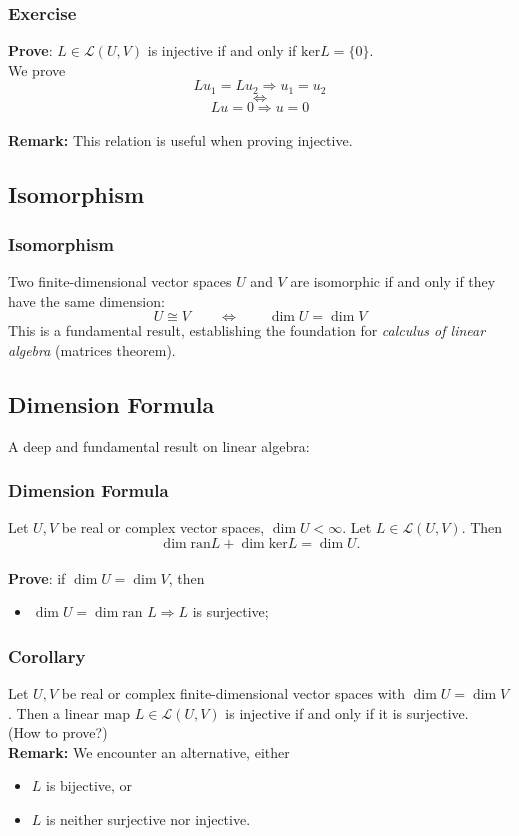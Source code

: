 \documentclass[12pt, t]{beamer}
\renewcommand{\emph}[1]{{\color{Turquoise3}\textsl{#1}}}
\newcommand{\nullspace}{~\\[15pt]}
\newcommand{\remark}{\textbf{Remark: }}
\begin{document}
\begin{frame}
    \frametitle{Exercise}
    \textbf{Prove}:
    $L\in\mathcal{L}(U,V)$ is injective if and only if $\text{ker}L=\{0\}$.
    \nullspace
    \pause
    We prove
    $$
        Lu_1=Lu_2\Rightarrow u_1=u_2
    $$
    $$
        \Leftrightarrow
    $$
    $$
        Lu=0\Rightarrow u=0
    $$
    \nullspace
    \remark This relation is useful when proving injective.
\end{frame}

\subsection{Isomorphism}
\begin{frame}
    \frametitle{Isomorphism}
    Two finite-dimensional vector spaces $U$ and $V$ are isomorphic if and only if they have the same dimension:
    \[U\cong V\qquad\Leftrightarrow\qquad\dim U=\dim V\]
    This is a fundamental result, establishing the foundation for \emph{calculus of linear algebra} (matrices theorem).

\end{frame}

\subsection{Dimension Formula}
\begin{frame}
    A deep and fundamental result on linear algebra:\nullspace
    \frametitle{Dimension Formula}
    Let $U,V$ be real or complex vector spaces, $\dim U<\infty$. Let $L\in\mathcal{L}(U,V)$. Then
    \begin{equation}
        \dim\text{ran}L+\dim\text{ker}L=\dim U.
    \end{equation}
    \nullspace
    \textbf{Prove}:
    if $\dim U= \dim V$, then
    \begin{itemize}
        \item $\dim U = \dim \text{ran } L \Rightarrow L$ is surjective;
    \end{itemize}
\end{frame}

\begin{frame}
    \frametitle{Corollary}
    Let $U,V$ be real or complex finite-dimensional vector spaces with $\dim U=\dim V$. Then a linear map $L\in\mathcal{L}(U,V)$ is injective if and only if it is surjective.
    \nullspace
    (How to prove?)
    \nullspace
    \remark We encounter an alternative, either
    \begin{itemize}
        \item $L$ is bijective, or
        \item $L$ is neither surjective nor injective.
    \end{itemize}
\end{frame}
\end{document}
